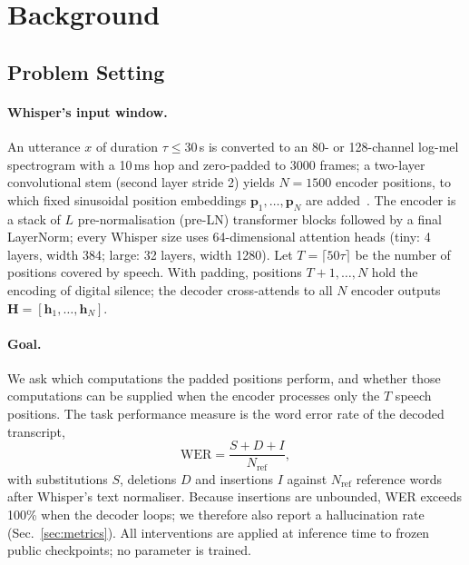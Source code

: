 \section{Background}
\label{sec:background}

\subsection{Problem Setting}

\paragraph{Whisper's input window.} An utterance $x$ of duration $\tau\le 30$\,s is converted to an 80- or 128-channel log-mel spectrogram with a 10\,ms hop and zero-padded to 3000 frames; a two-layer convolutional stem (second layer stride 2) yields $N=1500$ encoder positions, to which fixed sinusoidal position embeddings $\mathbf{p}_1,\dots,\mathbf{p}_N$ are added~\cite{radford2023whisper}. The encoder is a stack of $L$ pre-normalisation (pre-LN) transformer blocks followed by a final LayerNorm; every Whisper size uses 64-dimensional attention heads (tiny: 4 layers, width 384; large: 32 layers, width 1280). Let $T=\lceil 50\tau\rceil$ be the number of positions covered by speech. With padding, positions $T{+}1,\dots,N$ hold the encoding of digital silence; the decoder cross-attends to all $N$ encoder outputs $\mathbf{H}=[\mathbf{h}_1,\dots,\mathbf{h}_N]$.

\paragraph{Goal.} We ask which computations the padded positions perform, and whether those computations can be supplied when the encoder processes only the $T$ speech positions. The task performance measure is the word error rate of the decoded transcript,
\begin{equation}
    \mathrm{WER}
    = \frac{S+D+I}{N_{\mathrm{ref}}},
    \label{eq:objective}
\end{equation}
with substitutions $S$, deletions $D$ and insertions $I$ against $N_{\mathrm{ref}}$ reference words after Whisper's text normaliser. Because insertions are unbounded, WER exceeds 100\% when the decoder loops; we therefore also report a hallucination rate (Sec.~\ref{sec:metrics}). All interventions are applied at inference time to frozen public checkpoints; no parameter is trained.


